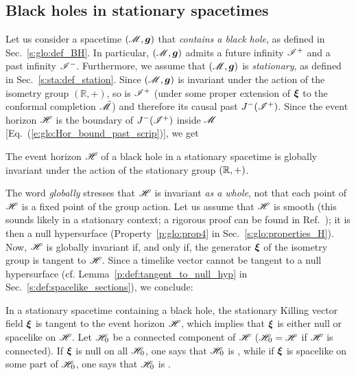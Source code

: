 \subsection{Black holes in stationary spacetimes}
\label{s:sta:BH_stationary}

Let us consider a spacetime $(\mathscr{M},\bm{g})$ that \emph{contains a black hole}, as defined in
Sec.~\ref{s:glo:def_BH}. In particular, $(\mathscr{M},\bm{g})$ admits a future
infinity $\mathscr{I}^+$ and a past infinity $\mathscr{I}^-$.
Furthermore, we assume that $(\mathscr{M},\bm{g})$ is \emph{stationary},
as defined in Sec.~\ref{s:sta:def_station}.
Since $(\mathscr{M},\bm{g})$ is invariant under the action of the isometry group $(\mathbb{R},+)$,
so is $\mathscr{I}^+$ (under some proper extension of $\bm{\xi}$ to the conformal
completion $\tilde{\mathscr{M}}$)
and therefore its causal past $J^-(\mathscr{I}^+)$. Since the event horizon $\mathscr{H}$
is the boundary of $J^-(\mathscr{I}^+)$
inside $\mathscr{M}$ [Eq.~(\ref{e:glo:Hor_bound_past_scrip})], we get

\begin{prop}
\label{p:sta:stationary_hor}
The event horizon $\mathscr{H}$ of a black hole in a stationary spacetime
is globally invariant under the action of the stationary group $(\mathbb{R},+)$.
\end{prop}

The word \emph{globally} stresses that
$\mathscr{H}$ is invariant \emph{as a whole}, not that
each point of $\mathscr{H}$ is a fixed point of the group action.
Let us assume that $\mathscr{H}$ is smooth (this sounds likely in a stationary context;
a rigorous proof can be found in Ref.~\cite{ChrusDGH01});
it is then a null hypersurface (Property~\ref{p:glo:prop4} in Sec.~\ref{s:glo:properties_H}).
Now, $\mathscr{H}$ is globally invariant if, and only if, the
generator $\bm{\xi}$ of the isometry group is tangent to $\mathscr{H}$.
Since a timelike vector cannot be tangent to a null hypersurface (cf.
Lemma~\ref{p:def:tangent_to_null_hyp} in Sec.~\ref{s:def:spacelike_sections}), we conclude:

\begin{prop}
\label{p:sta:xi_tangent_H}
In a stationary spacetime containing a black hole,
the stationary Killing vector field  $\bm{\xi}$ is tangent to the event horizon
$\mathscr{H}$, which implies that $\bm{\xi}$ is either null or spacelike on $\mathscr{H}$.
Let $\mathscr{H}_0$ be a connected component of $\mathscr{H}$
($\mathscr{H}_0 = \mathscr{H}$ if $\mathscr{H}$ is connected).
If $\bm{\xi}$ is null on all $\mathscr{H}_0$, one says that $\mathscr{H}_0$
is , while if $\bm{\xi}$ is
spacelike on some part of $\mathscr{H}_0$, one says that $\mathscr{H}_0$ is
.
\end{prop}

